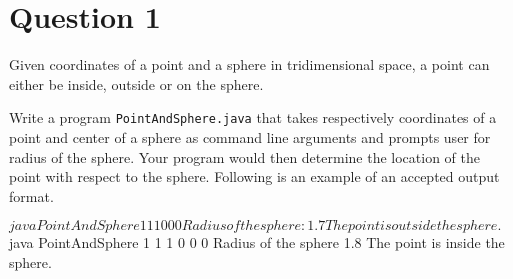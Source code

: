 %
%
%
%

\section*{Question 1}
Given coordinates of a point and a sphere in tridimensional space, a point can either be inside, outside or on the sphere.

Write a program \texttt{PointAndSphere.java} that takes respectively coordinates of a point and center of a sphere as command line arguments and prompts user for radius of the sphere.
Your program would then determine the location of the point with respect to the sphere.
Following is an example of an accepted output format.

\begin{terminal}
$ java PointAndSphere 1 1 1 0 0 0
Radius of the sphere: 1.7
The point is outside the sphere.
$ java PointAndSphere 1 1 1 0 0 0
Radius of the sphere 1.8
The point is inside the sphere.
\end{terminal}

